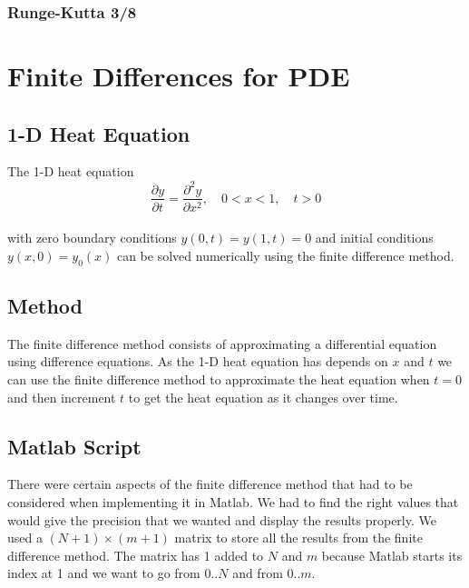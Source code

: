 \documentclass[12pt,twoside]{article}
\begin{document}
\subsubsection{Runge-Kutta 3/8}



\newpage
\section{Finite Differences for PDE}

\subsection{1-D Heat Equation}

The 1-D heat equation \\

\[
\frac{\partial y}{\partial t} = \frac{\partial ^2 y}{\partial x^2},\quad 0 < x < 1,\quad t > 0
\]\\

with zero boundary conditions \( y(0, t) = y(1, t) = 0 \) and initial conditions \\
\( y(x, 0) = y_0(x) \) can be solved numerically using the finite difference method.


\subsection{Method}

The finite difference method consists of approximating a differential equation using difference equations. As the 
1-D heat equation has depends on \( x \) and \( t \) we can use the finite difference method to approximate the heat
equation when \( t = 0 \) and then increment \( t \) to get the heat equation as it changes over time. 


\subsection{Matlab Script}

There were certain aspects of the finite difference method that had to be considered when implementing it in Matlab.
We had to find the right values that would give the precision that we wanted and display the results properly. We used a
\( (N+1) \times (m+1) \) matrix to store all the results from the finite difference method. The matrix has 1 added to \( N \) and
\( m \) because Matlab starts its index at 1 and we want to go from \( 0..N \) and from \( 0..m \).
\end{document}
